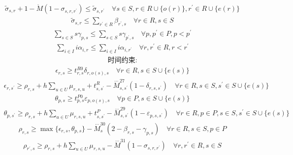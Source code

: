 \documentclass[UTF8,11pt]{ctexart}
\begin{document}
\[\begin{aligned}& \tilde{\sigma}_{s, r} + 1 - \ddot{M}(1 - \sigma_{s, r, r^{\prime}}) \le \tilde{\sigma}_{s, r^{\prime}} \quad \forall s \in S, r \in R \cup \{o(r)\}, r^{\prime} \in R \cup \{e(r)\}\end{aligned}\]
\[\begin{aligned}& \tilde{\sigma}_{s, r} \le \sum_{r^{\prime} \in R} \beta_{r^{\prime}, s} \quad \forall r \in R, s \in S\end{aligned}\]
\[\begin{aligned}& \sum_{s \in S} s \gamma_{p, s} \le \sum_{s \in S} s \gamma_{p^{\prime}, s} \quad \forall p, p^{\prime} \in P, p < p^{\prime}\end{aligned}\]
\[\begin{aligned}& \sum_{i \in I} i \alpha_{i, r} \le \sum_{i \in I} i \alpha_{i, r^{\prime}} \quad \forall r, r^{\prime} \in R, r < r^{\prime}\end{aligned}\]\[\begin{aligned}&\text{时间约束:}\end{aligned}\]
\[\begin{aligned}& \epsilon_{r, s} \ge t^{R0}_{r, s} \delta_{r, o(s), s} \quad \forall r \in R, s \in S \cup \{e(s)\}\end{aligned}\]
\[\begin{aligned}& \epsilon_{r, s^{\prime}} \ge \rho_{r, s} + h \sum_{u \in U} \mu_{r, s, u} + t^R_{s, s^{\prime}} - \overset{\cdots}{M}^{27}_{s, s^{\prime}}(1 - \delta_{r, s, s^{\prime}}) \quad \forall r \in R, s \in S, s^{\prime} \in S \cup \{e(s)\}\end{aligned}\]
\[\begin{aligned}& \theta_{p, s} \ge t^{P0}_{p, s} \varepsilon_{p, o(s), s} \quad \forall p \in P, s \in S \cup \{e(s)\}\end{aligned}\]
\[\begin{aligned}& \theta_{p, s^{\prime}} \ge \rho_{r, s} + h \sum_{u \in U} \mu_{r, s, u} + t^P_{s, s^{\prime}} - \overset{\cdots}{M}^{29}_{s, s^{\prime}}(1 - \varepsilon_{p, s, s^{\prime}}) \quad \forall r \in R, p \in P, s \in S, s^{\prime} \in S \cup \{e(s)\}\end{aligned}\]
\[\begin{aligned}& \rho_{r, s} \ge \max\{\epsilon_{r, s}, \theta_{p, s}\} - \overset{\cdots}{M}^{30}_s (2 - \beta_{r, s} - \gamma_{p, s}) \quad \forall r \in R, s \in S, p \in P\end{aligned}\]
\[\begin{aligned}& \rho_{r^{\prime}, s} \ge \rho_{r, s} + h \sum_{u \in U} \mu_{r, s, u} - \overset{\cdots}{M}^{31} (1 - \sigma_{s, r, r^{\prime}}) \quad \forall r, r^{\prime} \in R, s \in S\end{aligned}\]
\end{document}
